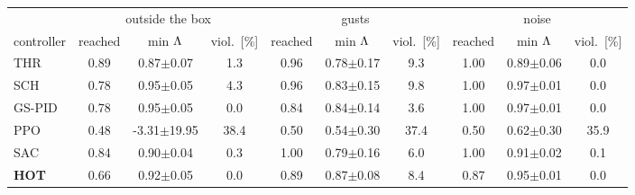 \begin{tabular}{l|ccc|ccc|ccc}\toprule
& \multicolumn{3}{c|}{outside the box} & \multicolumn{3}{c|}{gusts} & \multicolumn{3}{c}{noise}\\
controller & reached & min $\Lambda$ & viol.\ [\%] & reached & min $\Lambda$ & viol.\ [\%] & reached & min $\Lambda$ & viol.\ [\%]\\\midrule
THR & 0.89 & 0.87$\pm$0.07 & 1.3 & 0.96 & 0.78$\pm$0.17 & 9.3 & 1.00 & 0.89$\pm$0.06 & 0.0\\
SCH & 0.78 & 0.95$\pm$0.05 & 4.3 & 0.96 & 0.83$\pm$0.15 & 9.8 & 1.00 & 0.97$\pm$0.01 & 0.0\\
GS-PID & 0.78 & 0.95$\pm$0.05 & 0.0 & 0.84 & 0.84$\pm$0.14 & 3.6 & 1.00 & 0.97$\pm$0.01 & 0.0\\
PPO & 0.48 & -3.31$\pm$19.95 & 38.4 & 0.50 & 0.54$\pm$0.30 & 37.4 & 0.50 & 0.62$\pm$0.30 & 35.9\\
SAC & 0.84 & 0.90$\pm$0.04 & 0.3 & 1.00 & 0.79$\pm$0.16 & 6.0 & 1.00 & 0.91$\pm$0.02 & 0.1\\
\textbf{HOT} & 0.66 & 0.92$\pm$0.05 & 0.0 & 0.89 & 0.87$\pm$0.08 & 8.4 & 0.87 & 0.95$\pm$0.01 & 0.0\\
\bottomrule\end{tabular}